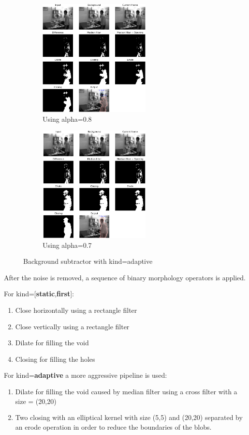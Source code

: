 \documentclass{article}
\begin{document}
\begin{figure}
    \centering
    \begin{subfigure}[t]{0.45\textwidth}
        \centering
        \includegraphics[width=160pt,keepaspectratio]{adaptive_alpha08_f482.png}
        \caption{Using alpha=0.8}
    \end{subfigure}
    \begin{subfigure}[t]{0.45\textwidth}
        \centering
        \includegraphics[width=160pt,keepaspectratio]{adaptive_alpha07_f482.png}
        \caption{Using alpha=0.7}
    \end{subfigure}
    \caption{Background subtractor with kind=adaptive}
    \label{adaptivealpha}
\end{figure}

After the noise is removed, a sequence of binary morphology operators is applied.

For kind=[\textbf{static},\textbf{first}]:
\begin{enumerate}
    \item Close horizontally using a rectangle filter
    \item Close vertically using a rectangle filter
    \item Dilate for filling the void
    \item Closing for filling the holes
\end{enumerate}
For kind=\textbf{adaptive} a more aggressive pipeline is used:
\begin{enumerate}
    \item Dilate for filling the void caused by median filter using a cross filter with a size = (20,20)
    \item Two closing with an elliptical kernel with size (5,5) and (20,20) separated by an erode operation in order to reduce the boundaries of the blobs.
\end{enumerate}
\end{document}
